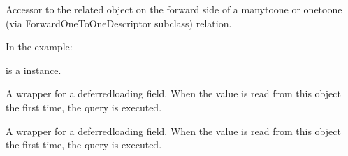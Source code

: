 \documentclass[letterpaper,10pt,spanish]{sphinxmanual}
\begin{document}
\begin{fulllineitems}
\begin{fulllineitems}

\pysigstartsignatures
{}
\pysigstopsignatures
\sphinxAtStartPar
Accessor to the related object on the forward side of a many\sphinxhyphen{}to\sphinxhyphen{}one or
one\sphinxhyphen{}to\sphinxhyphen{}one (via ForwardOneToOneDescriptor subclass) relation.

\sphinxAtStartPar
In the example:

\begin{sphinxVerbatim}[commandchars=\\\{\}]
 
       
\end{sphinxVerbatim}

\sphinxAtStartPar
{} is a  instance.

\end{fulllineitems}



\begin{fulllineitems}

\pysigstartsignatures
{}
\pysigstopsignatures
\end{fulllineitems}



\begin{fulllineitems}

\pysigstartsignatures
{}
\pysigstopsignatures
\sphinxAtStartPar
A wrapper for a deferred\sphinxhyphen{}loading field. When the value is read from this
object the first time, the query is executed.

\end{fulllineitems}



\begin{fulllineitems}

\pysigstartsignatures
{}
\pysigstopsignatures
\sphinxAtStartPar
A wrapper for a deferred\sphinxhyphen{}loading field. When the value is read from this
object the first time, the query is executed.


\end{fulllineitems}
\end{fulllineitems}
\end{document}

